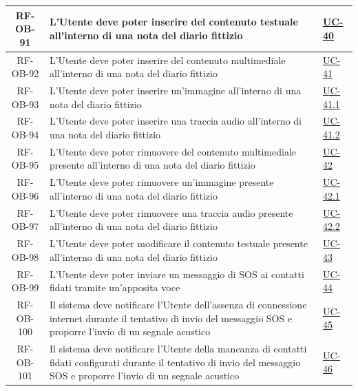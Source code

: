 \documentclass[a4paper,12pt]{article}
\begin{document}
\begin{center}
\begin{longtable}{|c|p{8.5cm}|>{\centering\arraybackslash}p{4cm}|}
RF-OB-91 & L'Utente deve poter inserire del contenuto testuale all'interno di una nota del diario fittizio & \hyperref[subsec:UC-40]{UC-40} \\
\hline

RF-OB-92 & L'Utente deve poter inserire del contenuto multimediale all'interno di una nota del diario fittizio & \hyperref[subsec:UC-41]{UC-41} \\
\hline

RF-OB-93 & L'Utente deve poter inserire un'immagine all'interno di una nota del diario fittizio & \hyperref[subsec:UC-41.1]{UC-41.1} \\
\hline

RF-OB-94 & L'Utente deve poter inserire una traccia audio all'interno di una nota del diario fittizio & \hyperref[subsec:UC-41.2]{UC-41.2} \\
\hline

RF-OB-95 & L'Utente deve poter rimuovere del contenuto multimediale presente all'interno di una nota del diario fittizio & \hyperref[subsec:UC-42]{UC-42} \\
\hline

RF-OB-96 & L'Utente deve poter rimuovere un'immagine presente all'interno di una nota del diario fittizio & \hyperref[subsec:UC-42.1]{UC-42.1} \\
\hline

RF-OB-97 & L'Utente deve poter rimuovere una traccia audio presente all'interno di una nota del diario fittizio & \hyperref[subsec:UC-42.2]{UC-42.2} \\
\hline

RF-OB-98 & L'Utente deve poter modificare il contenuto testuale presente all'interno di una nota del diario fittizio & \hyperref[subsec:UC-43]{UC-43} \\
\hline

RF-OB-99 & L'Utente deve poter inviare un messaggio di SOS ai contatti fidati tramite un'apposita voce & \hyperref[sec:UC-44]{UC-44} \\
\hline

RF-OB-100 & Il sistema deve notificare l'Utente dell'assenza di connessione internet durante il tentativo di invio del messaggio SOS e proporre l'invio di un segnale acustico & \hyperref[sec:UC-45]{UC-45} \\
\hline

RF-OB-101 & Il sistema deve notificare l'Utente della mancanza di contatti fidati configurati durante il tentativo di invio del messaggio SOS e proporre l'invio di un segnale acustico & \hyperref[sec:UC-46]{UC-46} \\
\hline


\end{longtable}
\end{center}
\end{document}
